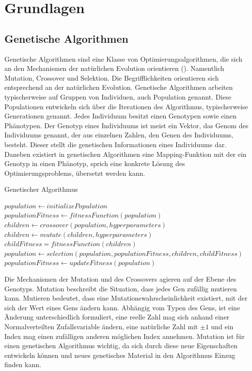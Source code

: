 \section{Grundlagen}
\label{sub:grundlagen}
\subsection{Genetische Algorithmen}

Genetische Algorithmen sind eine Klasse von Optimierungsalgorithmen, die sich an den Mechanismen der natürlichen Evolution orientieren (\cite{Simon.2013}).
Namentlich Mutation, Crossover und Selektion.
Die Begrifflichkeiten orientieren sich entsprechend an der natürlichen Evolution.
Genetische Algorithmen arbeiten typischerweise auf Gruppen von Individuen, auch Population genannt.
Diese Populationen entwickeln sich über die Iterationen des Algorithmus, typischerweise Generationen genannt.
Jedes Individuum besitzt einen Genotypen sowie einen Phänotypen.
Der Genotyp eines Individuums ist meist ein Vektor, das Genom des Individuums genannt, der aus einzelnen Zahlen, den Genen des Individuums, besteht.
Dieser stellt die genetischen Informationen eines Individuums dar. 
Daneben existiert in genetischen Algorithmen eine Mapping-Funktion mit der ein Genotyp in einen Phänotyp, sprich eine konkrete Lösung des Optimierungsproblems, übersetzt werden kann.

\begin{algorithm}
\caption{Genetischer Algorithmus} \label{alg:geneticAlgorihtm}
\begin{algorithmic}[1]
	\State $population \gets initializePopulation$
	\State $populationFitness \gets fitnessFunction(population)$
		\State $children \gets crossover(population,hyperparameters)$
		\State $children \gets mutate(children,hyperparameters)$
		\State $childFitness = fitnessFunction(children)$
		\State $population \gets selection(population,populationFitness,children,childFitness)$
		\State $populationFitness \gets updateFitness(population)$
	\EndFor
	\EndProcedure
\end{algorithmic}
\end{algorithm}

Die Mechanismen der Mutation und des Crossovers agieren auf der Ebene des Genotyps.
Mutation beschreibt die Situation, dass jedes Gen zufällig mutieren kann.
Mutieren bedeutet, dass eine Mutationswahrscheinlichkeit existiert, mit der sich der Wert eines Gens ändern kann.
Abhängig vom Typen des Gens, ist eine Änderung unterschiedlich formuliert, eine reelle Zahl mag sich anhand einer Normalverteilten Zufallsvariable ändern, eine natürliche Zahl mit $\pm1$ und ein Index mag einen zufälligen anderen möglichen Index annehmen.
Mutation ist für einen genetischen Algorithmus wichtig, da sich durch diese neue Eigenschaften entwickeln können und neues genetisches Material in den Algorithmus Einzug finden kann.

